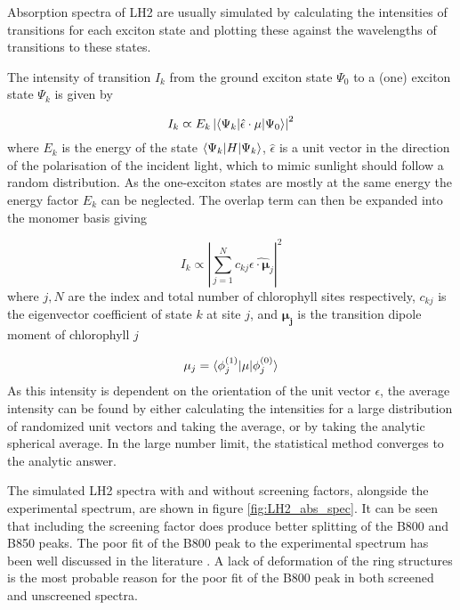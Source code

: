 Absorption spectra of LH2 are usually simulated by calculating the intensities of 
transitions for each exciton state and plotting these against the wavelengths of
transitions to these states. 

The intensity of transition $I_k$ from the ground exciton state $\Psi_0$ to a (one)
exciton state $\Psi_k$ is given by

\begin{equation}
    I_k \varpropto E_k \left\lvert \braket{\Psi_k| \hat{\epsilon} \cdot \mathbf{\mu} | \Psi_0} \right\rvert^2
\end{equation}
%
where $E_k$ is the energy of the state $\braket{\Psi_k|H|\Psi_k}$, $\hat{\epsilon}$
is a unit vector in the direction of the polarisation of the incident light, which
to mimic sunlight should follow a random distribution. As the one-exciton states 
are mostly at the same energy the energy factor $E_k$ can be neglected. The overlap
term can then be expanded into the monomer basis giving

\begin{equation}
    I_k \varpropto \left\lvert \sum^N_{j=1} c_{kj} \hat{\epsilon \cdot \mathbf{\mu}_j }\right\rvert^2
\end{equation}
%
where $j,N$ are the index and total number of chlorophyll sites respectively, $c_{kj}$
is the eigenvector coefficient of state $k$ at site $j$, and $\mathbf{\mu_j}$ is 
the transition dipole moment of chlorophyll $j$ 

\begin{equation}
    \mathbf{\mu}_j = \braket{\phi_j^{\left(1\right)}|\mathbf{\mu}|\phi_j^{\left(0\right)}}
\end{equation}
%
As this intensity is dependent on the orientation of the unit vector $\epsilon$,
the average intensity can be found by either calculating the intensities for a large
distribution of randomized unit vectors and taking the average, or by taking the
analytic spherical average. In the large number limit, the statistical method converges
to the analytic answer.

The simulated LH2 spectra with and without screening factors, alongside the experimental 
spectrum, are shown in figure \ref{fig:LH2_abs_spec}. It can be seen that including
the screening factor does produce better splitting of the B800 and B850 peaks. The
poor fit of the B800 peak to the experimental spectrum has been well discussed in
the literature \cite{Stross2016, Mennucci2019}. A lack of deformation of the ring 
structures is the most probable reason for the poor fit of the B800 peak in both 
screened and unscreened spectra.

